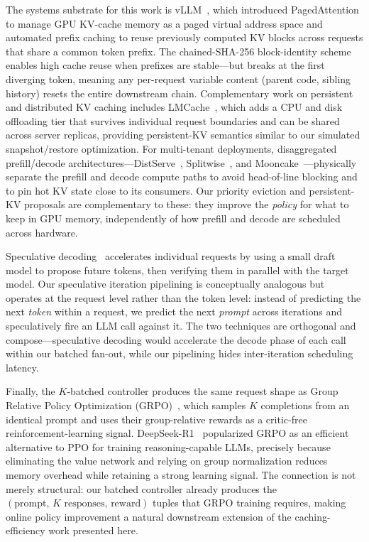 \documentclass{article}
\begin{document}
The systems substrate for this work is vLLM~\cite{kwon2023pagedattention},
which introduced PagedAttention to manage GPU KV-cache memory as a paged
virtual address space and automated prefix caching to reuse previously
computed KV blocks across requests that share a common token prefix.
The chained-SHA-256 block-identity scheme enables high cache reuse when
prefixes are stable---but breaks at the first diverging token, meaning
any per-request variable content (parent code, sibling history) resets
the entire downstream chain.
Complementary work on persistent and distributed KV caching includes
LMCache~\cite{liu2025lmcache}, which adds a CPU and disk offloading
tier that survives individual request boundaries and can be shared
across server replicas, providing persistent-KV semantics similar to
our simulated snapshot/restore optimization.
For multi-tenant deployments, disaggregated prefill/decode
architectures---DistServe~\cite{zhong2024distserve},
Splitwise~\cite{patel2024splitwise}, and
Mooncake~\cite{qin2024mooncake}---physically separate the prefill and
decode compute paths to avoid head-of-line blocking and to pin hot KV
state close to its consumers.
Our priority eviction and persistent-KV proposals are complementary to
these: they improve the \emph{policy} for what to keep in GPU memory,
independently of how prefill and decode are scheduled across hardware.

Speculative decoding~\cite{leviathan2023speculativedecoding} accelerates
individual requests by using a small draft model to propose future tokens,
then verifying them in parallel with the target model.
Our speculative iteration pipelining is conceptually analogous but
operates at the request level rather than the token level: instead of
predicting the next \emph{token} within a request, we predict the next
\emph{prompt} across iterations and speculatively fire an LLM call
against it.
The two techniques are orthogonal and compose---speculative decoding
would accelerate the decode phase of each call within our batched
fan-out, while our pipelining hides inter-iteration scheduling latency.

Finally, the $K$-batched controller produces the same request shape as
Group Relative Policy Optimization
(GRPO)~\cite{shao2024deepseekmath}, which samples $K$ completions from
an identical prompt and uses their group-relative rewards as a
critic-free reinforcement-learning signal.
DeepSeek-R1~\cite{deepseek2025deepseekr1} popularized GRPO as an
efficient alternative to PPO for training reasoning-capable LLMs,
precisely because eliminating the value network and relying on group
normalization reduces memory overhead while retaining a strong learning
signal.
The connection is not merely structural: our batched controller already
produces the $(\text{prompt},\, K\text{ responses},\, \text{reward})$
tuples that GRPO training requires, making online policy improvement a
natural downstream extension of the caching-efficiency work presented
here.
\end{document}
